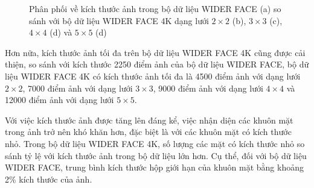 {\begin{figure}[H]
        \caption{Phân phối về kích thước ảnh trong bộ dữ liệu WIDER FACE \cite{yang2016wider} (a) so sánh với bộ dữ liệu WIDER FACE 4K dạng lưới $2 \times 2$ (b), $3 \times 3$ (c), $4 \times 4$ (d) và $5 \times 5$ (d)}
        \label{fig:widerface_4k_img_size}
    \end{figure}

    \noindent
    Hơn nữa, kích thước ảnh tối đa trên bộ dữ liệu WIDER FACE 4K cũng được cải thiện, so sánh với kích thước 2250 điểm ảnh của bộ dữ liệu WIDER FACE, bộ dữ liệu WIDER FACE 4K có kích thước ảnh tối đa là 4500 điểm ảnh với dạng lưới $2 \times 2$, 7000 điểm ảnh với dạng lưới $3 \times 3$, 9000 điểm ảnh với dạng lưới $4 \times 4$ và 12000 điểm ảnh với dạng lưới $5 \times 5$.

    \noindent
    Với việc kích thước ảnh được tăng lên đáng kể, việc nhận diện các khuôn mặt trong ảnh trở nên khó khăn hơn, đặc biệt là với các khuôn mặt có kích thước nhỏ.
    Trong bộ dữ liệu WIDER FACE 4K, số lượng các mặt có kích thước nhỏ so sánh tỷ lệ với kích thước ảnh trong bộ dữ liệu lớn hơn.
    Cụ thể, đối với bộ dữ liệu WIDER FACE, trung bình kích thước hộp giới hạn của khuôn mặt bằng khoảng 2\% kích thước của ảnh.

}
